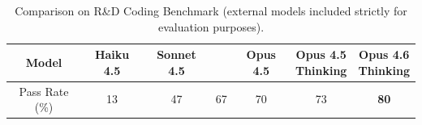 \begin{table}[ht]
\centering
\footnotesize
\caption{Comparison on R\&D Coding Benchmark (external models included strictly for evaluation purposes).}
\label{tab:code-agent}
\begin{tabular}{@{}ccccccc@{}}
\toprule
Model & Haiku 4.5 & Sonnet 4.5 & \dsvivpm{} & Opus 4.5 & \shortstack{Opus 4.5\\Thinking} & \shortstack{Opus 4.6\\Thinking} \\
\midrule
Pass Rate (\%) & 13 & 47 & 67 & 70 & 73 & \textbf{80} \\
\bottomrule
\end{tabular}
\end{table}
